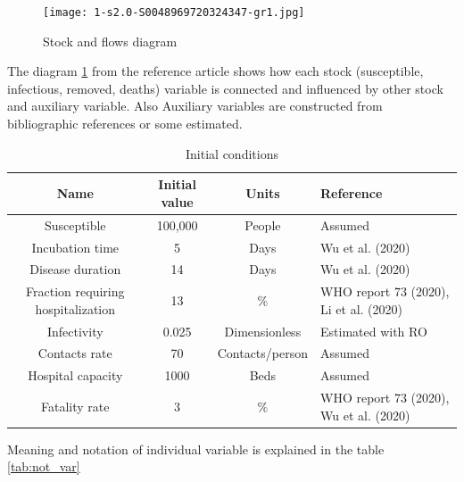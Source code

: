 \documentclass[12pt,a4paper,english]{article}
\begin{document}
    \begin{center}
        \begin{figure}[ht!]
            \texttt{[image: 1-s2.0-S0048969720324347-gr1.jpg]}
            \caption{Stock and flows diagram}
            \label{fig:graph}
        \end{figure}
    \end{center}
    
    The diagram \ref{fig:graph}  from the reference article shows how each stock (susceptible, infectious, removed, deaths) variable is connected and influenced by other stock and auxiliary variable.
    Also 
    Auxiliary variables are constructed from bibliographic references or some estimated.
    
    \begin{table}[h!]
        \centering
        \begin{tabularx}{\textwidth}{|c|c|c|X|}
            \hline
            Name & Initial value & Units & Reference \\
            \hline
            Susceptible	                        & 100,000 &	People & Assumed\\
            Incubation time	                    & 5	 &  Days & Wu et al. (2020)\\
            Disease duration                    & 14	&  Days & Wu et al. (2020)\\
            Fraction requiring hospitalization	& 13  & \% & WHO report 73 (2020), Li et al. (2020) \\
            Infectivity	                        & 0.025 & Dimensionless & Estimated with RO \\
            Contacts rate	                    & 70   & Contacts/person & Assumed \\
            Hospital capacity	                & 1000 & Beds & Assumed \\
            Fatality rate	                    & 3	   & \% & WHO report 73 (2020), Wu et al. (2020) \\
            \hline
        \end{tabularx}
        \caption{Initial conditions \cite{math_article}}
        \label{tab:init_vars}
    \end{table}
    
    Meaning and notation of individual variable is explained in the table \ref{tab:not_var}
\end{document}
